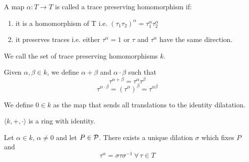 \begin{definition}
    A map $\alpha : T \to T$ is called a trace preserving homomorphism if:
    \begin{enumerate}[label=\roman*.]
        \item it is a homomorphism of T i.e. $(\tau_1\tau_2)^{\alpha} = \tau_1^{\alpha}\tau_2^{\alpha} $
        \item it preserves traces i.e. either $\tau^{\alpha} = 1$ or $\tau$ and $\tau^{\alpha}$ have the same direction.
    \end{enumerate}
\end{definition}

\noindent
We call the set of trace preserving homomorphisms $k$.

\begin{definition}
    Given $\alpha, \beta \in k$, we define $\alpha + \beta$ and $\alpha \cdot \beta$ such that
    \[ \tau^{\alpha+\beta} = \tau^{\alpha} \tau^{\beta} \]
    \[ \tau^{\alpha \cdot \beta} = (\tau^{\alpha} )^{\beta} = \tau^{\alpha \beta} \]
\end{definition}

\noindent
We define $0 \in k$ as the map that sends all translations to the identity dilatation.

\begin{theorem}
    $\langle k, +, \cdot\rangle$ is a ring with identity. \cite[Thm.~2.9]{artin}
\end{theorem}

\begin{theorem}
    Let $\alpha \in k$, $\alpha \neq 0$ and let $P \in \mathcal{P}$. There exists a unique dilation $\sigma$ which fixes $P$ and
    \[ \tau^\alpha = \sigma \tau \sigma^{-1}\ \forall\,\tau\in T \]
\end{theorem}

